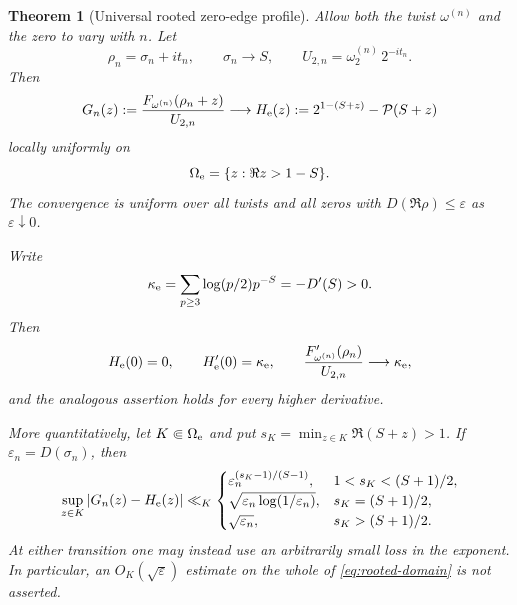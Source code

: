 \documentclass[11pt]{article}
\newtheorem{theorem}{Theorem}[section]
\theoremstyle{definition}
\theoremstyle{remark}
\newcommand{\cP}{\mathcal P}
\newcommand{\eps}{\varepsilon}
\begin{document}
\begin{theorem}[Universal rooted zero-edge profile]
\label{thm:rooted-zero-edge-profile}
Allow both the twist $\omega^{(n)}$ and the zero to vary with $n$.  Let
\[
 \rho_n=\sigma_n+it_n,
 \qquad \sigma_n\to S,
 \qquad U_{2,n}=\omega^{(n)}_2\,2^{-it_n}.
\]
Then
\begin{equation}
 G_n(z):=\frac{F_{\omega^{(n)}}(\rho_n+z)}{U_{2,n}}
 \longrightarrow
 H_{\rm e}(z):=2^{1-(S+z)}-\cP(S+z)
 \label{eq:rooted-zero-limit}
\end{equation}
locally uniformly on
\begin{equation}
 \Omega_{\rm e}=\{z:\Re z>1-S\}.
 \label{eq:rooted-domain}
\end{equation}
The convergence is uniform over all twists and all zeros with
$D(\Re\rho)\le\eps$ as $\eps\downarrow0$.

Write
\begin{equation}
 \kappa_{\rm e}
 =\sum_{p\ge3}\log(p/2)p^{-S}=-D'(S)>0.
 \label{eq:kappa-edge}
\end{equation}
Then
\begin{equation}
 H_{\rm e}(0)=0,
 \qquad H_{\rm e}'(0)=\kappa_{\rm e},
 \qquad
 \frac{F_{\omega^{(n)}}'(\rho_n)}{U_{2,n}}\longrightarrow\kappa_{\rm e},
 \label{eq:universal-edge-slope}
\end{equation}
and the analogous assertion holds for every higher derivative.

More quantitatively, let $K\Subset\Omega_{\rm e}$ and put
$s_K=\min_{z\in K}\Re(S+z)>1$.  If
$\eps_n=D(\sigma_n)$, then
\begin{equation}
 \sup_{z\in K}|G_n(z)-H_{\rm e}(z)|
 \ll_K
 \begin{cases}
  \eps_n^{(s_K-1)/(S-1)},&1<s_K<(S+1)/2,\\
  \sqrt{\eps_n\log(1/\eps_n)},&s_K=(S+1)/2,\\
  \sqrt{\eps_n},&s_K>(S+1)/2.
 \end{cases}
 \label{eq:rooted-profile-rate}
\end{equation}
At either transition one may instead use an arbitrarily small loss in
the exponent.  In particular, an $O_K(\sqrt\eps)$ estimate on the whole
of \eqref{eq:rooted-domain} is not asserted.
\end{theorem}
\end{document}
